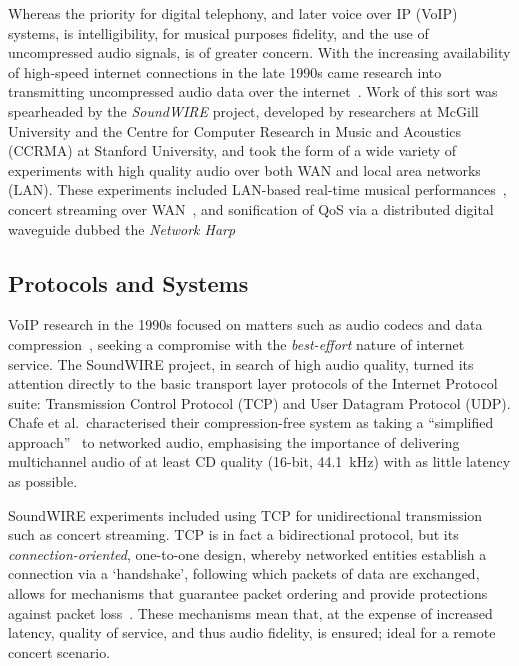 Whereas the priority for digital telephony, and later voice over IP (VoIP)
systems, is intelligibility, for musical purposes fidelity, and the use of
uncompressed audio signals, is of greater concern.
With the increasing availability of high-speed internet connections in the late
1990s came research into transmitting uncompressed audio data over the
internet~\citep{chafe_simplified_2000,xu_real-time_2000}.
Work of this sort was spearheaded by the \textit{SoundWIRE} project, developed
by researchers at McGill University and the Centre for Computer Research in
Music and Acoustics (CCRMA) at Stanford University, and took the form of
a wide variety of experiments with high quality audio over both WAN and local
area networks (LAN).
These experiments included LAN-based real-time musical
performances~\citep{chafe_simplified_2000}, concert streaming over
WAN~\citep{xu_real-time_2000,chafe_simplified_2000}, and sonification of QoS via
a distributed digital waveguide dubbed the
\textit{Network Harp}~\citep{chafe_simplified_2000,chafe_physical_2002}

\subsection{Protocols and Systems}\label{subsec:protocols-and-systems}

VoIP research in the 1990s focused on matters such as audio codecs and data
compression~\citep{turletti_inria_1995,hardman_successful_1998}, seeking a
compromise with the \textit{best-effort} nature of internet service.
The SoundWIRE project, in search of high audio quality, turned its attention
directly to the basic transport layer protocols of the Internet Protocol suite:
Transmission Control Protocol (TCP) and User Datagram Protocol (UDP).
Chafe et al.\ characterised their compression-free system as taking a
``simplified approach''~\citep{chafe_simplified_2000} to networked audio,
emphasising the importance of delivering multichannel audio of at least CD
quality (16-bit, \qty{44.1}{\kHz}) with as little latency as possible.

SoundWIRE experiments included using TCP for unidirectional transmission such as
concert streaming.
TCP is in fact a bidirectional protocol, but its \textit{connection-oriented},
one-to-one design, whereby networked entities establish a connection via a
`handshake', following which packets of data are exchanged, allows for
mechanisms that guarantee packet ordering and provide protections against packet
loss~\citep{schiavoni_alternatives_2013,al-dhief_performance_2018}.
These mechanisms mean that, at the expense of increased latency, quality of
service, and thus audio fidelity, is ensured; ideal for a remote concert
scenario.

